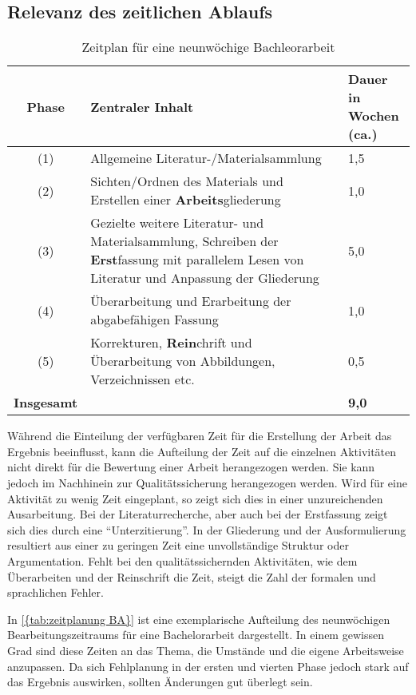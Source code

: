 \subsection{Relevanz des zeitlichen Ablaufs}
\begin{table}[!b]
    \begin{tabular}{c p{9cm} p{3cm}}
        
        \textbf{Phase} & \textbf{Zentraler Inhalt} & \parbox[c]{3cm}{\textbf{Dauer in\\ Wochen (ca.)}} \\ \hline
        (1) & Allgemeine Literatur-/Materialsammlung & 1,5 \\
        (2) & Sichten/Ordnen des Materials und Erstellen einer \textbf{Arbeits}gliederung & 1,0 \\
        (3) & Gezielte weitere Literatur- und Materialsammlung, Schreiben der \textbf{Erst}fassung mit parallelem Lesen von Literatur und Anpassung der Gliederung  & 5,0 \\
        (4) & Überarbeitung und Erarbeitung der abgabefähigen Fassung & 1,0 \\
        (5) & Korrekturen, \textbf{Rein}chrift und Überarbeitung von Abbildungen, Verzeichnissen etc. & 0,5 \\
        \textbf{Insgesamt} & & \textbf{9,0}
    \end{tabular}
    \caption{Zeitplan für eine neunwöchige Bachleorarbeit\cite[entnommen aus][]{Baensch:2013}}\label{{tab:zeitplanung BA}}
\end{table}
Während die Einteilung der verfügbaren Zeit für die Erstellung der Arbeit das Ergebnis beeinflusst, kann die Aufteilung der Zeit auf die einzelnen Aktivitäten nicht direkt für die Bewertung einer Arbeit herangezogen werden. Sie kann jedoch im Nachhinein zur Qualitätssicherung herangezogen werden. Wird für eine Aktivität zu wenig Zeit eingeplant, so zeigt sich dies in einer unzureichenden Ausarbeitung. Bei der Literaturrecherche, aber auch bei der Erstfassung zeigt sich dies durch eine \enquote{Unterzitierung}. In der Gliederung und der Ausformulierung resultiert aus einer zu geringen Zeit eine unvollständige Struktur oder Argumentation. Fehlt bei den qualitätssichernden Aktivitäten, wie dem Überarbeiten und der Reinschrift die Zeit, steigt die Zahl der formalen und sprachlichen Fehler. 

In \autoref{{tab:zeitplanung BA}} ist eine exemplarische Aufteilung des neunwöchigen Bearbeitungszeitraums für eine Bachelorarbeit dargestellt. In einem gewissen Grad sind diese Zeiten an das Thema, die Umstände und die eigene Arbeitsweise anzupassen. Da sich Fehlplanung in der ersten und vierten Phase jedoch stark auf das Ergebnis auswirken, sollten Änderungen gut überlegt sein.\cite[Vgl.][S. 49 f.]{Baensch:2013}

